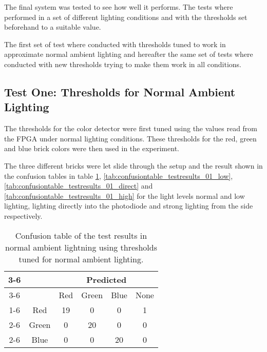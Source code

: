 The final system was tested to see how well it performs.
The tests where performed in a set of different lighting conditions and with the thresholds set beforehand to a suitable value.

The first set of test where conducted with thresholds tuned to work in approximate normal ambient lighting and hereafter the same set of tests where conducted with new thresholds trying to make them work in all conditions.


\subsection{Test One: Thresholds for Normal Ambient Lighting}

The thresholds for the color detector were first tuned using the values read from the FPGA under normal lighting conditions.
These thresholds for the red, green and blue brick colors were then used in the experiment.

The three different bricks were let slide through the setup and the result shown in the confusion tables in table \ref{tab:confusiontable_testresults_01_normal}, \ref{tab:confusiontable_testresults_01_low}, \ref{tab:confusiontable_testresults_01_direct} and \ref{tab:confusiontable_testresults_01_high} for the light levels normal and low lighting, lighting directly into the photodiode and strong lighting from the side respectively.


\begin{table}[H]
\centering
\begin{tabular}{c c|c|c|c|c|}
\cline{3-6}
 & &  \multicolumn{4}{|c|}{Predicted} \\ \cline{3-6}
 & & Red & Green & Blue & None \\ \cline{1-6} 
\multicolumn{1}{ |c|  }{\multirow{3}{*}{Actual}} & Red & 19 & 0 & 0 & 1 \\ \cline{2-6}
\multicolumn{1}{ |c|  }{} & Green & 0 & 20 & 0 & 0 \\ \cline{2-6}
\multicolumn{1}{ |c|  }{} & Blue & 0 & 0 & 20 & 0 \\ \hline
\end{tabular}
\caption[Confusion table in normal ambient lightning, test one.]{Confusion table of the test results in normal ambient lightning using thresholds tuned for normal ambient lighting.}
\label{tab:confusiontable_testresults_01_normal}
\end{table}



